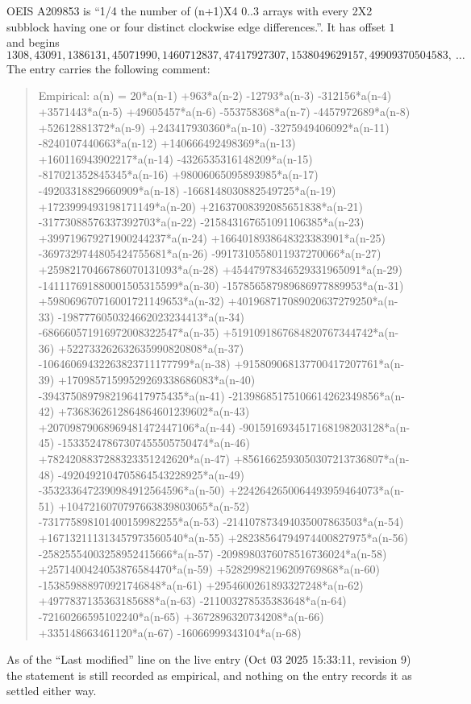 \documentclass[11pt,a4paper]{article}
\theoremstyle{plain}
\theoremstyle{definition}
\begin{document}
OEIS A209853 is ``1/4 the number of (n+1)X4 0..3 arrays with every 2X2 subblock having one or four distinct clockwise edge differences.''. It has offset $1$ and begins
\[
1308, 43091, 1386131, 45071990, 1460712837, 47417927307, 1538049629157, 49909370504583,\ \dots
\]
The entry carries the following comment:
\begin{quote}\small
Empirical: a(n) = 20*a(n-1) +963*a(n-2) -12793*a(n-3) -312156*a(n-4) +3571443*a(n-5) +49605457*a(n-6) -553758368*a(n-7) -4457972689*a(n-8) +52612881372*a(n-9) +243417930360*a(n-10) -3275949406092*a(n-11) -8240107440663*a(n-12) +140666492498369*a(n-13) +160116943902217*a(n-14) -4326535316148209*a(n-15) -817021352845345*a(n-16) +98006065095893985*a(n-17) -49203318829660909*a(n-18) -1668148030882549725*a(n-19) +1723999493198171149*a(n-20) +21637008392085651838*a(n-21) -31773088576337392703*a(n-22) -215843167651091106385*a(n-23) +399719679271900244237*a(n-24) +1664018938648323383901*a(n-25) -3697329744805424755681*a(n-26) -9917310558011937270066*a(n-27) +25982170466786070131093*a(n-28) +45447978346529331965091*a(n-29) -141117691880001505315599*a(n-30) -157856587989686977889953*a(n-31) +598069670716001721149653*a(n-32) +401968717089020637279250*a(n-33) -1987776050324662023234413*a(n-34) -686660571916972008322547*a(n-35) +5191091867684820767344742*a(n-36) +522733262632635990820808*a(n-37) -10646069432263823711177799*a(n-38) +915809068137700417207761*a(n-39) +17098571599529269338686083*a(n-40) -3943750897982196417975435*a(n-41) -21398685175106614262349856*a(n-42) +7368362612864864601239602*a(n-43) +20709879068969481472447106*a(n-44) -9015916934517168198203128*a(n-45) -15335247867307455505750474*a(n-46) +7824208837288323351242620*a(n-47) +8561662593050307213736807*a(n-48) -4920492104705864543228925*a(n-49) -3532336472390984912564596*a(n-50) +2242642650064493959464073*a(n-51) +1047216070797663839803065*a(n-52) -731775898101400159982255*a(n-53) -214107873494035007863503*a(n-54) +167132111313457973560540*a(n-55) +28238564794974400827975*a(n-56) -25825554003258952415666*a(n-57) -2098980376078516736024*a(n-58) +2571400424053876584470*a(n-59) +52829982196209769868*a(n-60) -153859888970921746848*a(n-61) +2954600261893327248*a(n-62) +4977837135363185688*a(n-63) -211003278535383648*a(n-64) -72160266595102240*a(n-65) +3672896320734208*a(n-66) +335148663461120*a(n-67) -16066999343104*a(n-68)
\end{quote}
As of the ``Last modified'' line on the live entry (Oct 03 2025 15:33:11, revision 9) the statement is
still recorded as empirical, and nothing on the entry records it as settled either way.
\end{document}
